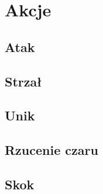 \chapter{Akcje}

\section{Atak}

\section{Strzał}

\section{Unik}

\section{Rzucenie czaru}

\section{Skok}
